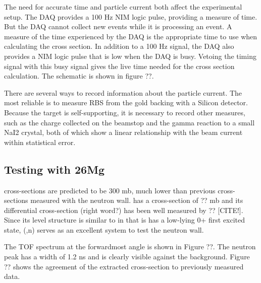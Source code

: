 The need for accurate time and particle current both affect the experimental setup.  The DAQ provides a 100 Hz NIM logic pulse, providing a measure of time.  But the DAQ cannot collect new events while it is processing an event.  A measure of the time experienced by the DAQ is the appropriate time to use when calculating the cross section.  In addition to a 100 Hz signal, the DAQ also provides a NIM logic pulse that is low when the DAQ is busy.  Vetoing the timing signal with this busy signal gives the live time needed for the cross section calculation.  The schematic is shown in figure ??.

There are several ways to record information about the particle current.  The most reliable is to measure RBS from the gold backing with a Silicon detector.  Because the  target is self-supporting, it is necessary to record other measures, such as the charge collected on the beamstop and the gamma reaction to a small NaI2 crystal, both of which show a linear relationship with the beam current within statistical error.



\subsection{Testing with 26Mg}

\GeTargets cross-sections are predicted to be 300 mb, much lower than previous cross-sections measured with the neutron wall.   has a cross-section of ?? mb and its differential cross-section (right word?) has been well measured by ?? [CITE!].  Since its level structure is similar to \GeTargets in that is has a low-lying 0+ first excited state, (,n) serves as an excellent system to test the neutron wall.


The TOF spectrum at the forwardmost angle is shown in Figure ??.  The neutron peak has a width of 1.2 ns and is clearly visible against the background.  Figure ?? shows the agreement of the extracted cross-section to previously measured data.


